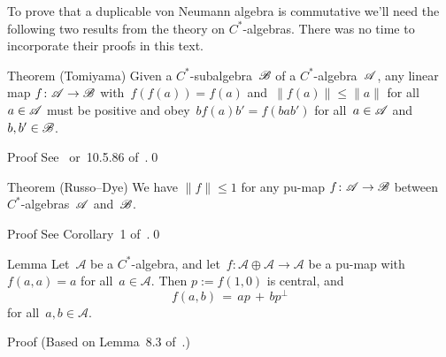 \documentclass[a]{subfiles}
\begin{document}
\begin{parsec}%
\begin{point}%
To prove that a duplicable von Neumann 
algebra is commutative we'll need the following two results from the theory
on $C^*$-algebras.
There was no time to incorporate their proofs in this text.
\end{point}
\begin{point}[tomiyama]{Theorem (Tomiyama)}%
Given a $C^*$-subalgebra~$\mathscr{B}$
of a $C^*$-algebra~$\mathscr{A}$,
any linear map $f\colon \mathscr{A}\to\mathscr{B}$
with~$f(f(a))=f(a)$ and~$\|f(a)\|\leq\|a\|$ 
for all~$a\in \mathscr{A}$
must be positive
and obey~$bf(a)b'=f(bab')$
for all~$a\in\mathscr{A}$ and~$b,b'\in\mathscr{B}$.
\begin{point}{Proof}%
See~\cite{tomiyama}
or~10.5.86 of~\cite{kr}.\qed
\end{point}
\end{point}
\begin{point}{Theorem (Russo--Dye)}%
We have $\|f\|\leq 1$
for any pu-map $f\colon \mathscr{A}\to\mathscr{B}$
between $C^*$-algebras~$\mathscr{A}$
and~$\mathscr{B}$.
\begin{point}{Proof}%
See Corollary~1 of~.\qed
\end{point}
\end{point}
\begin{point}{Lemma}%
Let~$\mathscr{A}$ be a $C^*$-algebra,
and let~$f\colon \mathscr{A}\oplus\mathscr{A}\to \mathscr{A}$
be a pu-map 
with $f(a,a)=a$ for all~$a\in \mathscr{A}$.
Then $p:=f(1,0)$ is central,
and
\begin{equation*}
	f(a,b) \,=\, ap\,+\, bp^\perp
\end{equation*}
for all~$a,b\in\mathscr{A}$.
\begin{point}{Proof}%
(Based on Lemma~8.3 of~\cite{ndlmcs}.)


\end{point}
\end{point}
\end{parsec}
\end{document}
